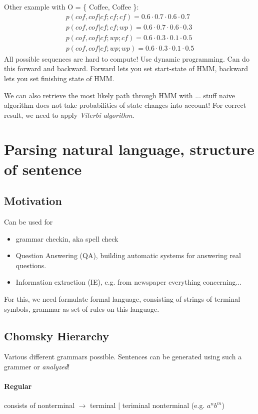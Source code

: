 \documentclass[11pt]{article}
\begin{document}
Other example with O =  \{ Coffee, Coffee \}:
\begin{eqnarray*}
	p(cof, cof | cf; cf; cf) = 0.6 \cdot 0.7\cdot 0.6 \cdot 0.7 \\
	p(cof, cof | cf; cf; wp) = 0.6 \cdot 0.7\cdot 0.6\cdot0.3 \\
	p(cof, cof | cf; wp; cf) = 0.6 \cdot 0.3\cdot 0.1\cdot 0.5 \\
	p(cof, cof | cf; wp; wp) = 0.6 \cdot 0.3\cdot 0.1\cdot 0.5
\end{eqnarray*}
All possible sequences are hard to compute! Use dynamic programming. Can do this forward
and backward. Forward lets you set start-state of HMM, backward lets you set finishing
state of HMM.

We can also retrieve the most likely path through HMM with ... stuff naive algorithm does
 not take probabilities of state changes into account! For correct result, we need to
 apply \emph{Viterbi algorithm}.
 
\section{Parsing natural language, structure of sentence}
\subsection{Motivation}
Can be used for 
\begin{itemize}
	\item grammar checkin, aka spell check
	\item Question Answering (QA), building automatic systems for answering real questions.
	\item Information extraction (IE), e.g. from newspaper everything concerning...
\end{itemize} 
For this, we need formulate formal language, consisting of strings of terminal symbols,
grammar as set of rules on this language.

\subsection{Chomsky Hierarchy}
Various different grammars possible. Sentences can be generated using such a grammer or \emph{analyzed}!

\paragraph{Regular} consists of nonterminal $\rightarrow$ terminal | teriminal nonterminal (e.g. $a^nb^m$)
\end{document}
